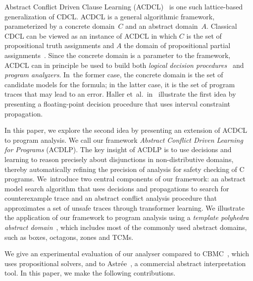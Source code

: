 Abstract Conflict Driven Clause Learning (ACDCL)~\cite{dhk2013-popl} is one
such lattice-based generalization of CDCL.  ACDCL is a general algorithmic
framework, parameterized by a concrete domain~$C$ and an abstract
domain~$A$.  Classical CDCL can be viewed as an instance of ACDCL in which
$C$ is the set of propositional truth assignments and $A$ the domain of
propositional partial assignments~\cite{leo-thesis}.  Since the concrete
domain is a parameter to the framework, ACDCL can in principle
be used to build both \emph{logical decision
procedures}~\cite{DBLP:journals/fmsd/BrainDGHK14} and \emph{program
analyzers}.  In~the former case, the concrete domain is the set of candidate
models for the formula; in the latter case, it is the set of program traces
that may lead to an error.  Haller
et~al.~in~\cite{DBLP:journals/fmsd/BrainDGHK14} illustrate the first idea by
presenting a floating-point decision procedure that uses interval constraint
propagation.


In this paper, we explore the second idea by presenting an extension of 
ACDCL to program analysis.  We call our 
framework \emph{Abstract Conflict Driven Learning for Programs}
(ACDLP).  The key insight of ACDLP is to use decisions and learning to reason 
precisely about disjunctions in non-distributive domains, thereby automatically 
refining the precision of analysis for safety checking of C programs.  
We~introduce two central components of our framework: an abstract
model search algorithm that uses decisions and propagations to 
search for counterexample trace and an abstract conflict analysis 
procedure that approximates a set of unsafe traces through transformer 
learning.
We illustrate the application of our framework to program analysis 
using a \textit{template polyhedra abstract domain}~\cite{vmcai05}, 
which includes most of the commonly used abstract domains, such as boxes, 
octagons, zones and TCMs.  

We give an experimental evaluation of our analyser compared 
to CBMC~\cite{cbmc.tacas:2004}, which uses propositional solvers, and to 
Astr{\'e}e~\cite{DBLP:conf/pldi/BlanchetCCFMMMR03}, a commercial abstract 
interpretation tool.  In this paper, we make the following contributions.

